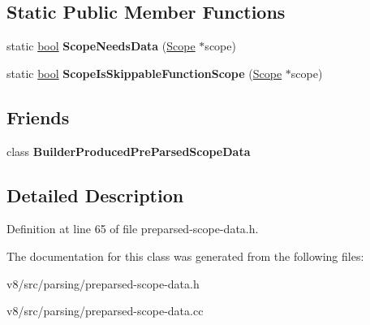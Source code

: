 \subsection*{Static Public Member Functions}
\begin{DoxyCompactItemize}
\item 
\mbox{\label{classv8_1_1internal_1_1PreParsedScopeDataBuilder_a4bf08752b201fcc441a61de5c97a8363}} 
static \mbox{\hyperlink{classbool}{bool}} {\bfseries Scope\+Needs\+Data} (\mbox{\hyperlink{classv8_1_1internal_1_1Scope}{Scope}} $\ast$scope)
\item 
\mbox{\label{classv8_1_1internal_1_1PreParsedScopeDataBuilder_a034e4e4f8114848893b0c23704a4faec}} 
static \mbox{\hyperlink{classbool}{bool}} {\bfseries Scope\+Is\+Skippable\+Function\+Scope} (\mbox{\hyperlink{classv8_1_1internal_1_1Scope}{Scope}} $\ast$scope)
\end{DoxyCompactItemize}
\subsection*{Friends}
\begin{DoxyCompactItemize}
\item 
\mbox{\label{classv8_1_1internal_1_1PreParsedScopeDataBuilder_a08f2c2f9df8cc610c7632defaec2380e}} 
class {\bfseries Builder\+Produced\+Pre\+Parsed\+Scope\+Data}
\end{DoxyCompactItemize}


\subsection{Detailed Description}


Definition at line 65 of file preparsed-\/scope-\/data.\+h.



The documentation for this class was generated from the following files\+:\begin{DoxyCompactItemize}
\item 
v8/src/parsing/preparsed-\/scope-\/data.\+h\item 
v8/src/parsing/preparsed-\/scope-\/data.\+cc\end{DoxyCompactItemize}
